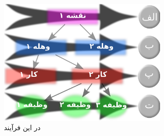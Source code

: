 \begin{figure}
\centering
\includegraphics[width=0.75\textwidth]{image/standard/build/bamboo-workflow-objects}
\caption[فرآیند مجتمع سازی پیوسته یا ]{
	در این فرآيند
}
\label{image/standard/build/bamboo-workflow-objects}
\end{figure}


% 
% 
% 
% 
% 
% 
% 
% 
% 
    

